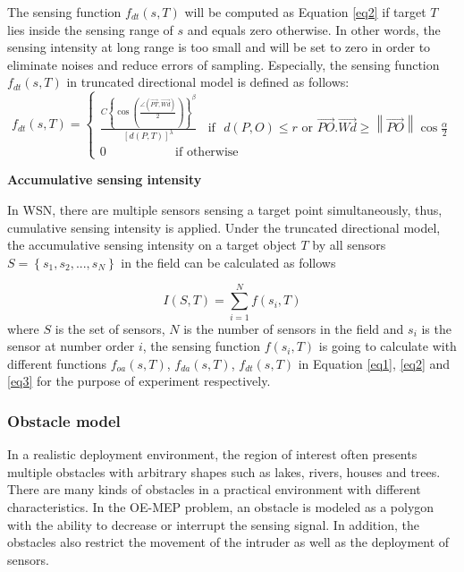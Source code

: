 \documentclass[final]{elsarticle}
\begin{document}
The sensing function $f_{dt}(s,T)$ will be computed as Equation \eqref{eq2} if target $T$ lies inside the sensing range of $s$ and equals zero otherwise. In other words, the sensing intensity at long range is too small and will be set to zero in order to eliminate noises and reduce errors of sampling. Especially, the sensing function $f_{dt}(s,T)$ in truncated directional model is defined as follows:
\begin{equation}
\label{eq3}
f_{dt}({s},T) = \left\{
\begin{aligned}
 \frac {{C{{\left\{ {\cos \left( {\frac{{\angle (\overrightarrow {PT} ,\overrightarrow {Wd}) }}{2}} \right)} \right\}}}^\beta }} {{{{\left[ {d(P,T)} \right]}^\lambda }}} \:\:\:\:\text{if} \:\:\: d(P,O) \le r \text{ or } \overrightarrow {PO} .\overrightarrow {Wd}  \ge \left\| {\overrightarrow {PO} } \right\|\cos \frac{\alpha}{2} \\
 0 \:\:\:\:\:\:\:\:\:\:\:\:\:\:\:\:\:\:\:\:\:\:\:\:\:\text{if  otherwise}\:\:\:\:\:\:\:\:\:\:\:\:\:\:\:\:\:\:\:\:\:\:\:\:\:\:\:\:\:\:\:\:\:\:\:\:\:\:\:\:\:\:\:\:\:\:\:\:\:\:\:\:\:\:\:\:\:\:
\end{aligned}
\right.
\end{equation}

\noindent\textbf{Accumulative sensing intensity}

In WSN, there are multiple sensors sensing a target point simultaneously, thus, cumulative sensing intensity is applied. Under the truncated directional model, the accumulative sensing intensity on a target object $ T $ by all sensors $S = \left\{ {{s_1},{s_2},...,{s_N}} \right\}$ in the field can be calculated as follows

\begin{equation}
\label{eq4}
I(S, T) = \sum\limits_{i = 1}^{N} {f({s_i},T)} 
\end{equation}
where $ S $ is the set of sensors, $ N $ is the number of sensors in the field and $s_i$ is the sensor at number order $ i $, the sensing function $ f({s_i},T)$ is going to calculate with different functions $f_{oa}({s},T)$,  $ f_{da}({s},T) $, $f_{dt}({s},T)$ in Equation \eqref{eq1}, \eqref{eq2} and \eqref{eq3} for the purpose of experiment respectively. 

\subsubsection{Obstacle model}
In a realistic deployment environment, the region of interest often presents multiple obstacles with arbitrary shapes such as lakes, rivers, houses and trees. There are many kinds of obstacles in a practical environment with different characteristics. In the OE-MEP problem, an obstacle is modeled as a polygon with the ability to decrease or interrupt the sensing signal. In addition, the obstacles also restrict the movement of the intruder as well as the deployment of sensors. 
\end{document}
